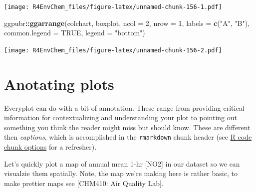 \documentclass[
]{book}
\newenvironment{Shaded}{\begin{snugshade}}{\end{snugshade}}
\newcommand{\AttributeTok}[1]{\textcolor[rgb]{0.13,0.29,0.53}{#1}}
\newcommand{\CommentTok}[1]{\textcolor[rgb]{0.56,0.35,0.01}{\textit{#1}}}
\newcommand{\ConstantTok}[1]{\textcolor[rgb]{0.56,0.35,0.01}{#1}}
\newcommand{\DecValTok}[1]{\textcolor[rgb]{0.00,0.00,0.81}{#1}}
\newcommand{\FunctionTok}[1]{\textcolor[rgb]{0.13,0.29,0.53}{\textbf{#1}}}
\newcommand{\NormalTok}[1]{#1}
\newcommand{\OtherTok}[1]{\textcolor[rgb]{0.56,0.35,0.01}{#1}}
\newcommand{\SpecialCharTok}[1]{\textcolor[rgb]{0.81,0.36,0.00}{\textbf{#1}}}
\newcommand{\StringTok}[1]{\textcolor[rgb]{0.31,0.60,0.02}{#1}}
\begin{document}
\texttt{[image: R4EnvChem\_files/figure-latex/unnamed-chunk-156-1.pdf]}

\begin{Shaded}
\begin{Highlighting}[]
\NormalTok{ggpubr}\SpecialCharTok{::}\FunctionTok{ggarrange}\NormalTok{(colchart, }
\NormalTok{                  boxplot, }
                  \AttributeTok{ncol =} \DecValTok{2}\NormalTok{, }
                  \AttributeTok{nrow =} \DecValTok{1}\NormalTok{,}
                  \AttributeTok{labels =} \FunctionTok{c}\NormalTok{(}\StringTok{"A"}\NormalTok{, }\StringTok{"B"}\NormalTok{),}
                  \AttributeTok{common.legend =} \ConstantTok{TRUE}\NormalTok{, }
                  \AttributeTok{legend =} \StringTok{"bottom"}\NormalTok{)}
\end{Highlighting}
\end{Shaded}

\texttt{[image: R4EnvChem\_files/figure-latex/unnamed-chunk-156-2.pdf]}

\hypertarget{anotating-plots}{%
\section{Anotating plots}\label{anotating-plots}}

Everyplot can do with a bit of annotation. These range from providing critical information for contextualizing and understanding your plot to pointing out something you think the reader might miss but should know. These are different then \emph{captions}, which is accomplished in the \texttt{rmarkdown} chunk header (see \protect\hyperlink{r-code-chunk-options}{R code chunk options} for a refresher).

Let's quickly plot a map of annual mean 1-hr {[}NO2{]} in our dataset so we can visualzie them spatially. Note, the map we're making here is rather basic, to make prettier maps see {[}CHM410: Air Quality Lab{]}.

\begin{Shaded}
\end{Shaded}
\end{document}
